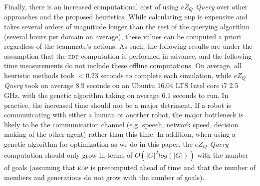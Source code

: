 \documentclass[letterpaper]{article}
\begin{document}


Finally, there is an increased computational cost of using \emph{$eZ_Q$ Query} over other approaches and the proposed heuristics. While calculating \textsc{ed}p is expensive and takes several orders of magnitude longer than the rest of the querying algorithm (several hours per domain on average), these values
can be computed a priori regardless of the teammate's actions. As such, the following results are under the assumption that the \textsc{edp} computation is performed in advance, and the following time measurements do not include these offline computations. %
On average, all heuristic methods took $<0.23$ seconds to complete each simulation, while \emph{$eZ_Q$ Query} took on average $8.9$ seconds on an Ubuntu 16.04 LTS Intel core i7 2.5 GHz, with the genetic algorithm taking on average $6.1$ seconds to run. In practice, the increased time should not be a major detriment. If a robot is communicating with either a human or another robot, the major bottleneck is likely to be the communication channel (e.g. speech, network speed, decision making of the other agent) rather than this time. In addition, when using a genetic algorithm for optimization as we do in this paper, the \emph{$eZ_Q$ Query} computation should only grow in terms of $O(|G|^2log(|G|))$ with the number of goals (assuming that \textsc{edp} is precomputed ahead of time and that the number of members and generations do not grow with the number of goals).





\end{document}
